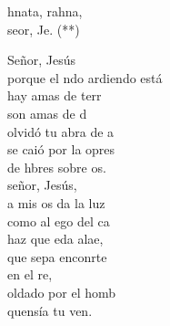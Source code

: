\begin{cancion}[Marahnata][Nico]%
	\begin{chorus}%
	hnata, rahna,\\
	 seor, Je. (**)\\
	\end{chorus}%
	 Señor, Jesús\\
	porque el ndo ardiendo está\\
	hay amas de terr\\
	son amas de d\\
	 olvidó tu abra de a\\
	se caió por la opres\\
	de hbres sobre os.\\
	 señor, Jesús,\\
	a mis os da la luz\\
	como al ego del ca\\
	haz que eda alae,\\
	que sepa enconrte\\
	en el re,\\
	oldado por el homb\\
	quensía tu ven.\\
\end{cancion}%
